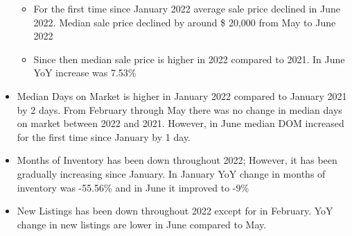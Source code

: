 \documentclass[
]{article}
\providecommand{\tightlist}{%
  \setlength{\itemsep}{0pt}\setlength{\parskip}{0pt}}
\begin{document}
\begin{itemize}
  \begin{itemize}
  \tightlist
  \item
    For the first time since January 2022 average sale price declined in
    June 2022. Median sale price declined by around \$ 20,000 from May
    to June 2022
  \item
    Since then median sale price is higher in 2022 compared to 2021. In
    June YoY increase was 7.53\%
  \end{itemize}
\item
  Median Days on Market is higher in January 2022 compared to January
  2021 by 2 days. From February through May there was no change in
  median days on market between 2022 and 2021. However, in June median
  DOM increased for the first time since January by 1 day.
\item
  Months of Inventory has been down throughout 2022; However, it has
  been gradually increasing since January. In January YoY change in
  months of inventory was -55.56\% and in June it improved to -9\%
\item
  New Listings has been down throughout 2022 except for in February. YoY
  change in new listings are lower in June compared to May.
\end{itemize}
\end{document}
